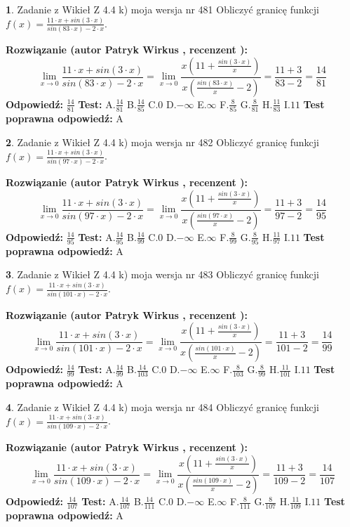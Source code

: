 \documentclass[12pt, a4paper]{article}
\theoremstyle{definition} %
\newtheorem{zad}{}
\newcommand{\zadStart}[1]{\begin{zad}#1\newline}
\newcommand{\zadStop}{\end{zad}}
\newcommand{\rozwStart}[2]{\noindent \textbf{Rozwiązanie (autor #1 , recenzent #2): }\newline}
\newcommand{\rozwStop}{\newline}
\newcommand{\odpStart}{\noindent \textbf{Odpowiedź:}\newline}
\newcommand{\odpStop}{\newline}
\newcommand{\testStart}{\noindent \textbf{Test:}\newline}
\newcommand{\testStop}{\newline}
\newcommand{\kluczStart}{\noindent \textbf{Test poprawna odpowiedź:}\newline}
\newcommand{\kluczStop}{\newline}
\begin{document}
\zadStart{Zadanie z Wikieł Z 4.4 k) moja wersja nr 481}
Obliczyć granicę funkcji $f(x)=\frac{11\cdot x +sin(3\cdot x)}{sin(83\cdot x) -2\cdot x}$.
\zadStop
\rozwStart{Patryk Wirkus}{}
$$\lim\limits_{x\to 0}\frac{11\cdot x +sin(3\cdot x)}{sin(83\cdot x) -2\cdot x}
=\lim\limits_{x\to 0}\frac{x(11+\frac{sin(3\cdot x)}{x})}{x(\frac{sin(83\cdot x)}{x}-2)}
=\frac{11+3}{83-2} = \frac{14}{81}$$
\rozwStop
\odpStart
$\frac{14}{81}$
\odpStop
\testStart
A.$\frac{14}{81}$
B.$\frac{14}{85}$
C.$0$
D.$-\infty$
E.$\infty$
F.$\frac{8}{85}$
G.$\frac{8}{81}$
H.$\frac{11}{83}$
I.$11$
\testStop
\kluczStart
A
\kluczStop



\zadStart{Zadanie z Wikieł Z 4.4 k) moja wersja nr 482}
Obliczyć granicę funkcji $f(x)=\frac{11\cdot x +sin(3\cdot x)}{sin(97\cdot x) -2\cdot x}$.
\zadStop
\rozwStart{Patryk Wirkus}{}
$$\lim\limits_{x\to 0}\frac{11\cdot x +sin(3\cdot x)}{sin(97\cdot x) -2\cdot x}
=\lim\limits_{x\to 0}\frac{x(11+\frac{sin(3\cdot x)}{x})}{x(\frac{sin(97\cdot x)}{x}-2)}
=\frac{11+3}{97-2} = \frac{14}{95}$$
\rozwStop
\odpStart
$\frac{14}{95}$
\odpStop
\testStart
A.$\frac{14}{95}$
B.$\frac{14}{99}$
C.$0$
D.$-\infty$
E.$\infty$
F.$\frac{8}{99}$
G.$\frac{8}{95}$
H.$\frac{11}{97}$
I.$11$
\testStop
\kluczStart
A
\kluczStop



\zadStart{Zadanie z Wikieł Z 4.4 k) moja wersja nr 483}
Obliczyć granicę funkcji $f(x)=\frac{11\cdot x +sin(3\cdot x)}{sin(101\cdot x) -2\cdot x}$.
\zadStop
\rozwStart{Patryk Wirkus}{}
$$\lim\limits_{x\to 0}\frac{11\cdot x +sin(3\cdot x)}{sin(101\cdot x) -2\cdot x}
=\lim\limits_{x\to 0}\frac{x(11+\frac{sin(3\cdot x)}{x})}{x(\frac{sin(101\cdot x)}{x}-2)}
=\frac{11+3}{101-2} = \frac{14}{99}$$
\rozwStop
\odpStart
$\frac{14}{99}$
\odpStop
\testStart
A.$\frac{14}{99}$
B.$\frac{14}{103}$
C.$0$
D.$-\infty$
E.$\infty$
F.$\frac{8}{103}$
G.$\frac{8}{99}$
H.$\frac{11}{101}$
I.$11$
\testStop
\kluczStart
A
\kluczStop



\zadStart{Zadanie z Wikieł Z 4.4 k) moja wersja nr 484}
Obliczyć granicę funkcji $f(x)=\frac{11\cdot x +sin(3\cdot x)}{sin(109\cdot x) -2\cdot x}$.
\zadStop
\rozwStart{Patryk Wirkus}{}
$$\lim\limits_{x\to 0}\frac{11\cdot x +sin(3\cdot x)}{sin(109\cdot x) -2\cdot x}
=\lim\limits_{x\to 0}\frac{x(11+\frac{sin(3\cdot x)}{x})}{x(\frac{sin(109\cdot x)}{x}-2)}
=\frac{11+3}{109-2} = \frac{14}{107}$$
\rozwStop
\odpStart
$\frac{14}{107}$
\odpStop
\testStart
A.$\frac{14}{107}$
B.$\frac{14}{111}$
C.$0$
D.$-\infty$
E.$\infty$
F.$\frac{8}{111}$
G.$\frac{8}{107}$
H.$\frac{11}{109}$
I.$11$
\testStop
\kluczStart
A
\kluczStop
\end{document}
